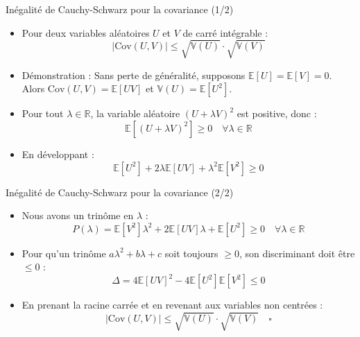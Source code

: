 \documentclass[11pt,aspectratio=169]{beamer}
\newcommand{\E}{\mathbb{E}}
\newcommand{\Var}{\mathbb{V}}
\newcommand{\Cov}{\mathrm{Cov}}
\newcommand{\R}{\mathbb{R}}
\begin{document}
\begin{frame}{Inégalité de Cauchy-Schwarz pour la covariance (1/2)}

\begin{itemize}

\item Pour deux variables aléatoires $U$ et $V$ de carré intégrable :
  \[
  |\Cov(U, V)| \leq \sqrt{\Var(U)} \cdot \sqrt{\Var(V)}
  \]\newline

\item Démonstration : Sans perte de généralité, supposons $\E[U] = \E[V] = 0$. Alors $\Cov(U,V) = \E[UV]$ et $\Var(U) = \E[U^2]$.\newline

\item Pour tout $\lambda \in \R$, la variable aléatoire $(U + \lambda V)^2$ est positive, donc :
  \[
  \E\left[(U + \lambda V)^2\right] \geq 0 \quad \forall \lambda \in \R
  \]\newline

\item En développant :
  \[
  \E[U^2] + 2\lambda \E[UV] + \lambda^2 \E[V^2] \geq 0
  \]

\end{itemize}

\end{frame}

\begin{frame}{Inégalité de Cauchy-Schwarz pour la covariance (2/2)}

\begin{itemize}

\item Nous avons un trinôme en $\lambda$ :
  \[
  P(\lambda) = \E[V^2] \lambda^2 + 2\E[UV] \lambda + \E[U^2] \geq 0 \quad \forall \lambda \in \R
  \]\newline

\item Pour qu'un trinôme $a\lambda^2 + b\lambda + c$ soit toujours $\geq 0$, son discriminant doit être $\leq 0$ :
  \[
  \Delta = 4\E[UV]^2 - 4\E[U^2]\E[V^2] \leq 0
  \]\newline

\item En prenant la racine carrée et en revenant aux variables non centrées :
  \[
  \boxed{|\Cov(U, V)| \leq \sqrt{\Var(U)} \cdot \sqrt{\Var(V)}} \quad \square
  \]

\end{itemize}

\end{frame}
\end{document}
